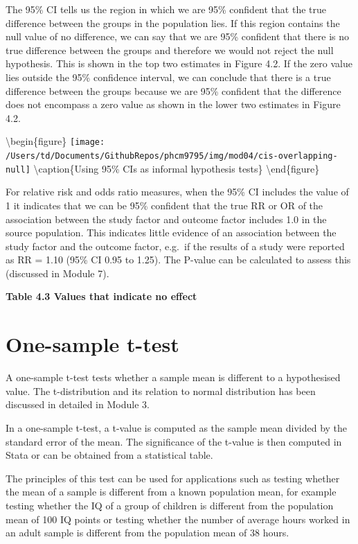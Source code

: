 \documentclass[
]{memoir}
\begin{document}
The 95\% CI tells us the region in which we are 95\% confident that the true difference between the groups in the population lies. If this region contains the null value of no difference, we can say that we are 95\% confident that there is no true difference between the groups and therefore we would not reject the null hypothesis. This is shown in the top two estimates in Figure 4.2. If the zero value lies outside the 95\% confidence interval, we can conclude that there is a true difference between the groups because we are 95\% confident that the difference does not encompass a zero value as shown in the lower two estimates in Figure 4.2.

\textbackslash begin\{figure\}
\texttt{[image: /Users/td/Documents/GithubRepos/phcm9795/img/mod04/cis-overlapping-null]} \textbackslash caption\{Using 95\% CIs as informal hypothesis tests\}\label{fig:cis-overlapping-null}
\textbackslash end\{figure\}

For relative risk and odds ratio measures, when the 95\% CI includes the value of 1 it indicates that we can be 95\% confident that the true RR or OR of the association between the study factor and outcome factor includes 1.0 in the source population. This indicates little evidence of an association between the study factor and the outcome factor, e.g.~if the results of a study were reported as RR = 1.10 (95\% CI 0.95 to 1.25). The P-value can be calculated to assess this (discussed in Module 7).

\textbf{Table 4.3 Values that indicate no effect}

\hypertarget{one-sample-t-test}{%
\section{One-sample t-test}\label{one-sample-t-test}}

A one-sample t-test tests whether a sample mean is different to a hypothesised value. The t-distribution and its relation to normal distribution has been discussed in detailed in Module 3.

In a one-sample t-test, a t-value is computed as the sample mean divided by the standard error of the mean. The significance of the t-value is then computed in Stata or can be obtained from a statistical table.

The principles of this test can be used for applications such as testing whether the mean of a sample is different from a known population mean, for example testing whether the IQ of a group of children is different from the population mean of 100 IQ points or testing whether the number of average hours worked in an adult sample is different from the population mean of 38 hours.
\end{document}
